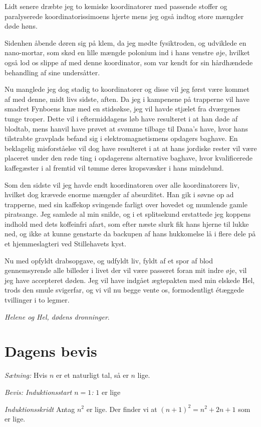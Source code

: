 \begin{minipage}[t]{150mm}
Lidt senere dræbte jeg to kemiske koordinatorer med passende stoffer og paralyserede koordinatorissimoens hjerte mens jeg også indtog store mængder døde høns.

Sidenhen åbende døren sig på klem, da jeg mødte fysiktroden, og udviklede en nano-mortar, som skød en lille mængde polonium ind i hans venstre øje, hvilket også lod os slippe af med denne koordinator, som var kendt for sin hårdhændede behandling af sine undersåtter.

Nu manglede jeg dog stadig to koordinatorer og disse vil jeg først være kommet af med denne, midt livs sidste, aften. Da jeg i kampenene på trapperne vil have smadret Fynboens knæ med en stidsøkse, jeg vil havde stjælet fra dværgenes tunge troper. Dette vil i eftermiddagens løb have resulteret i at han døde af blodtab, mens hanvil have prøvet at svømme tilbage til Dana's have, hvor hans tilstrabte gravplads befand sig i elektromagnetismens opdagers baghave. En beklagelig misforståelse vil dog have resulteret i at at hans jordiske rester vil være placeret under den røde ting i opdagerens alternative baghave, hvor kvalificerede kaffegæster i al fremtid vil tømme deres kropsvæsker i hans mindelund.

Som den sidste vil jeg havde endt koordinatoren over alle koordinatorers liv, hvilket dog krævede enorme mængder af absurditet. Han gik i søvne op ad trapperne, med sin kaffekop svingende farligt over hovedet og mumlende gamle piratsange. Jeg samlede al min snilde, og i et splitsekund erstattede jeg koppens indhold med dets koffeinfri afart, som efter næste slurk fik hans hjerne til lukke ned, og ikke at kunne genstarte da backupen af hans hukkomelse lå i flere dele på et hjemmeslagteri ved Stillehavets kyst.

Nu med opfyldt drabsopgave, og udfyldt liv, fyldt af et spor af blod gennemsyrende alle billeder i livet der vil være passeret foran mit indre øje, vil jeg have accepteret døden. Jeg vil have indgået ægtepakten med min elskede Hel, trods den smule svigerfar, og vi vil nu begge vente os, formodentligt étæggede tvillinger i to legmer. 

\emph{Helene og Hel, dødens dronninger}. 

\section*{Dagens bevis}
\emph{Sætning:} Hvis $n$ er et naturligt tal, så er $n$ lige.

\emph{Bevis: Induktionsstart $n=1$:} $1$ er lige

\emph{Induktionsskridt} Antag $n^2$ er lige. Der finder vi at $(n+1)^2=n^2+2n+1$ som er lige.
 

\end{minipage}
